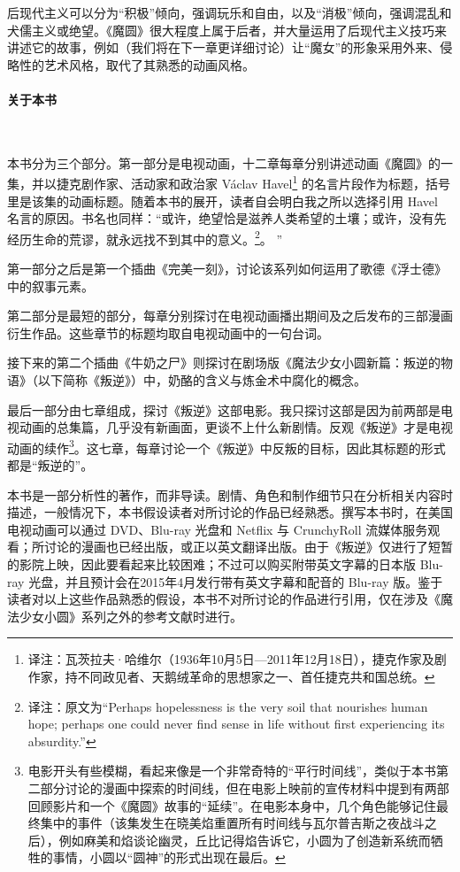 后现代主义可以分为“积极”倾向，强调玩乐和自由，以及“消极”倾向，强调混乱和犬儒主义或绝望\cite{ref6}。《魔圆》很大程度上属于后者，并大量运用了后现代主义技巧来讲述它的故事，例如（我们将在下一章更详细讨论）让“魔女”的形象采用外来、侵略性的艺术风格，取代了其熟悉的动画风格。
\paragraph{关于本书}~{}

本书分为三个部分。第一部分是电视动画，十二章每章分别讲述动画《魔圆》的一集，并以捷克剧作家、活动家和政治家 Václav Havel\footnote{译注：瓦茨拉夫·哈维尔（1936年10月5日—2011年12月18日），捷克作家及剧作家，持不同政见者、天鹅绒革命的思想家之一、首任捷克共和国总统。} 的名言片段作为标题，括号里是该集的动画标题。随着本书的展开，读者自会明白我之所以选择引用 Havel 名言的原因。书名也同样：“或许，绝望恰是滋养人类希望的土壤；或许，没有先经历生命的荒谬，就永远找不到其中的意义。\footnote{译注：原文为``Perhaps hopelessness is the very soil that nourishes human hope; perhaps one could never find sense in life without first experiencing its absurdity.'' }\cite{ref7}。 ” 

第一部分之后是第一个插曲《完美一刻》，讨论该系列如何运用了歌德《浮士德》中的叙事元素。

第二部分是最短的部分，每章分别探讨在电视动画播出期间及之后发布的三部漫画衍生作品。这些章节的标题均取自电视动画中的一句台词。

接下来的第二个插曲《牛奶之尸》则探讨在剧场版《魔法少女小圆新篇：叛逆的物语》（以下简称《叛逆》）中，奶酪的含义与炼金术中腐化的概念。

最后一部分由七章组成，探讨《叛逆》这部电影。我只探讨这部是因为前两部是电视动画的总集篇，几乎没有新画面，更谈不上什么新剧情。反观《叛逆》才是电视动画的续作\footnote{电影开头有些模糊，看起来像是一个非常奇特的“平行时间线”，类似于本书第二部分讨论的漫画中探索的时间线，但在电影上映前的宣传材料中提到有两部回顾影片和一个《魔圆》故事的“延续”。在电影本身中，几个角色能够记住最终集中的事件（该集发生在晓美焰重置所有时间线与瓦尔普吉斯之夜战斗之后），例如麻美和焰谈论幽灵，丘比记得焰告诉它，小圆为了创造新系统而牺牲的事情，小圆以“圆神”的形式出现在最后。}。这七章，每章讨论一个《叛逆》中反叛的目标，因此其标题的形式都是“叛逆的\underline{\makebox[1cm]{}}”。

本书是一部分析性的著作，而非导读。剧情、角色和制作细节只在分析相关内容时描述，一般情况下，本书假设读者对所讨论的作品已经熟悉。撰写本书时，在美国电视动画可以通过 DVD、Blu-ray 光盘和 Netflix 与 CrunchyRoll 流媒体服务观看；所讨论的漫画也已经出版，或正以英文翻译出版。由于《叛逆》仅进行了短暂的影院上映，因此要看起来比较困难；不过可以购买附带英文字幕的日本版 Blu-ray 光盘，并且预计会在2015年4月发行带有英文字幕和配音的 Blu-ray 版。鉴于读者对以上这些作品熟悉的假设，本书不对所讨论的作品进行引用，仅在涉及《魔法少女小圆》系列之外的参考文献时进行。

